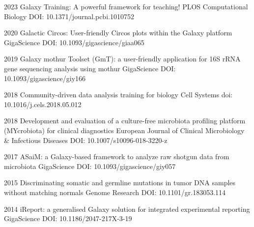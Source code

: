 \documentclass[]{shiltemann-cv}
\begin{document}
\begin{entrylist}
\entry
  {2023}
  {Galaxy Training: A powerful framework for teaching!}
  {PLOS Computational Biology}
  {DOI: 10.1371/journal.pcbi.1010752 }

\end{entrylist}
\begin{entrylist}

\entry
  {2020}
  {Galactic Circos: User-friendly Circos plots within the Galaxy platform}
  {GigaScience}
  {DOI: 10.1093/gigascience/giaa065}

\end{entrylist}
\begin{entrylist}

\entry
  {2019}
  {Galaxy mothur Toolset (GmT): a user-friendly application for 16S rRNA gene sequencing analysis using mothur}
  {GigaScience}
  {DOI: 10.1093/gigascience/giy166}

\end{entrylist}
\begin{entrylist}

\entry
 {2018}
 {Community-driven data analysis training for biology}
 {Cell Systems}
 {doi: 10.1016/j.cels.2018.05.012}

\end{entrylist}
\begin{entrylist}

\entry
  {2018}
  {Development and evaluation of a culture-free microbiota profiling platform (MYcrobiota) for clinical diagnostics}
  {European Journal of Clinical Microbiology \& Infectious Diseases}
  {DOI: 10.1007/s10096-018-3220-z}


\end{entrylist}
\begin{entrylist}

\entry
  {2017}
  {ASaiM: a Galaxy-based framework to analyze raw shotgun data from microbiota}
  {GigaScience}
  {DOI: 10.1093/gigascience/giy057}


\end{entrylist}
\begin{entrylist}

\entry
  {2015}
  {Discriminating somatic and germline mutations in tumor DNA samples without matching normals }
  {Genome Research}
  {DOI: 10.1101/gr.183053.114}

\end{entrylist}
\begin{entrylist}

\entry
  {2014}
  {iReport: a generalised Galaxy solution for integrated experimental reporting}
  {GigaScience}
  {DOI: 10.1186/2047-217X-3-19}
\end{entrylist}
\end{document}
